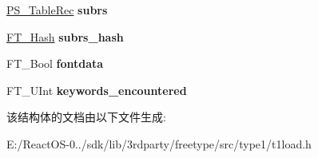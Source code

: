\begin{DoxyCompactItemize}
\mbox{\label{struct_t1___loader___a937ecec2799afd369e87eed5f0aec05c}} 
\hyperlink{struct_p_s___table_rec__}{P\+S\+\_\+\+Table\+Rec} {\bfseries subrs}
\item 
\mbox{\label{struct_t1___loader___a9335be6c31a202d4c351b1feb1816bf6}} 
\hyperlink{struct_f_t___hash_rec__}{F\+T\+\_\+\+Hash} {\bfseries subrs\+\_\+hash}
\item 
\mbox{\label{struct_t1___loader___a27294f1f95b9f43911860d9d613ac047}} 
F\+T\+\_\+\+Bool {\bfseries fontdata}
\item 
\mbox{\label{struct_t1___loader___acccf00a901400e98ad8d24ed461c68b3}} 
F\+T\+\_\+\+U\+Int {\bfseries keywords\+\_\+encountered}
\end{DoxyCompactItemize}


该结构体的文档由以下文件生成\+:\begin{DoxyCompactItemize}
\item 
E\+:/\+React\+O\+S-\/0../sdk/lib/3rdparty/freetype/src/type1/t1load.\+h\end{DoxyCompactItemize}
